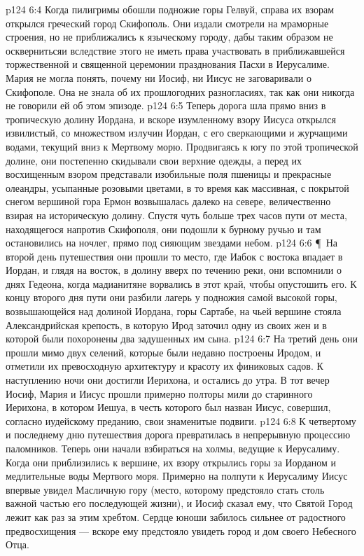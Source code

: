 \vs p124 6:4 Когда пилигримы обошли подножие горы Гелвуй, справа их взорам открылся греческий город Скифополь. Они издали смотрели на мраморные строения, но не приближались к языческому городу, дабы таким образом не осквернитьсяи вследствие этого не иметь права участвовать в приближавшейся торжественной и священной церемонии празднования Пасхи в Иерусалиме. Мария не могла понять, почему ни Иосиф, ни Иисус не заговаривали о Скифополе. Она не знала об их прошлогодних разногласиях, так как они никогда не говорили ей об этом эпизоде.
\vs p124 6:5 Теперь дорога шла прямо вниз в тропическую долину Иордана, и вскоре изумленному взору Иисуса открылся извилистый, со множеством излучин Иордан, с его сверкающими и журчащими водами, текущий вниз к Мертвому морю. Продвигаясь к югу по этой тропической долине, они постепенно скидывали свои верхние одежды, а перед их восхищенным взором представали изобильные поля пшеницы и прекрасные олеандры, усыпанные розовыми цветами, в то время как массивная, с покрытой снегом вершиной гора Ермон возвышалась далеко на севере, величественно взирая на историческую долину. Спустя чуть больше трех часов пути от места, находящегося напротив Скифополя, они подошли к бурному ручью и там остановились на ночлег, прямо под сияющим звездами небом.
\vs p124 6:6 \P\ На второй день путешествия они прошли то место, где Иабок с востока впадает в Иордан, и глядя на восток, в долину вверх по течению реки, они вспомнили о днях Гедеона, когда мадианитяне ворвались в этот край, чтобы опустошить его. К концу второго дня пути они разбили лагерь у подножия самой высокой горы, возвышающейся над долиной Иордана, горы Сартабе, на чьей вершине стояла Александрийская крепость, в которую Ирод заточил одну из своих жен и в которой были похоронены два задушенных им сына.
\vs p124 6:7 На третий день они прошли мимо двух селений, которые были недавно построены Иродом, и отметили их превосходную архитектуру и красоту их финиковых садов. К наступлению ночи они достигли Иерихона, и остались до утра. В тот вечер Иосиф, Мария и Иисус прошли примерно полторы мили до старинного Иерихона, в котором Иешуа, в честь которого был назван Иисус, совершил, согласно иудейскому преданию, свои знаменитые подвиги.
\vs p124 6:8 К четвертому и последнему дню путешествия дорога превратилась в непрерывную процессию паломников. Теперь они начали взбираться на холмы, ведущие к Иерусалиму. Когда они приблизились к вершине, их взору открылись горы за Иорданом и медлительные воды Мертвого моря. Примерно на полпути к Иерусалиму Иисус впервые увидел Масличную гору (место, которому предстояло стать столь важной частью его последующей жизни), и Иосиф сказал ему, что Святой Город лежит как раз за этим хребтом. Сердце юноши забилось сильнее от радостного предвосхищения --- вскоре ему предстояло увидеть город и дом своего Небесного Отца.
